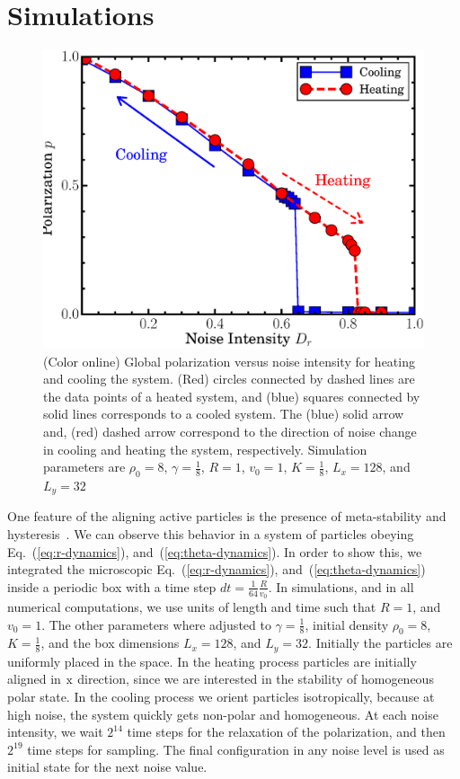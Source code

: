 \documentclass[reprint,floatfix,amsmath,amssymb,aps,pre,showkeys,showpacs,superscriptaddress]{revtex4-1}
\newcommand{\reqs}[2]{Eq.~(\ref{#1}), and~(\ref{#2})}
\begin{document}
\section{Simulations}
\label{section:simulations}

\begin{figure}
	\centering
	\includegraphics[width=\columnwidth]{Fig1_p-noise-sim}
	\caption{(Color online) Global polarization versus noise intensity for heating and cooling the system. (Red) circles connected by dashed lines are the data points of a heated system, and (blue) squares connected by solid lines corresponds to a cooled system. The (blue) solid arrow and, (red) dashed arrow correspond to the direction of noise change in cooling and heating the system, respectively. Simulation parameters are $\rho_0=8$, $\gamma=\tfrac{1}{8}$, $R=1$, $v_0=1$, $K=\tfrac{1}{8}$, $L_x=128$, and $L_y=32$}
	\label{fig:sim-hystersis}
\end{figure}

One feature of the aligning active particles is the presence of meta-stability and hysteresis~\cite{Gregoire2004,nagy2007,Chate2008,Chate2008a,Ihle2013invasion,solon2015from,solon2015flocking,solon2015pattern,thuroff2014numerical}. We can observe this behavior in a system of particles obeying \reqs{eq:r-dynamics}{eq:theta-dynamics}. In order to show this, we integrated the microscopic \reqs{eq:r-dynamics}{eq:theta-dynamics} inside a periodic box with a time step $dt=\tfrac{1}{64} \tfrac{R}{v_0}$. In simulations, and in all numerical computations, we use units of length and time such that $R=1$, and $v_0=1$. The other parameters where adjusted to $\gamma = \tfrac{1}{8}$, initial density $\rho_0=8$, $K = \tfrac{1}{8}$, and the box dimensions $L_x=128$, and $L_y=32$. Initially the particles are uniformly placed in the space. In the heating process particles are initially aligned in ${\rm x}$ direction, since we are interested in the stability of homogeneous polar state. In the cooling process we orient particles isotropically, because at high noise, the system quickly gets non-polar and homogeneous. At each noise intensity, we wait $2^{14}$ time steps for the relaxation of the polarization, and then $2^{19}$ time steps for sampling. The final configuration in any noise level is used as initial state for the next noise value.
\end{document}
